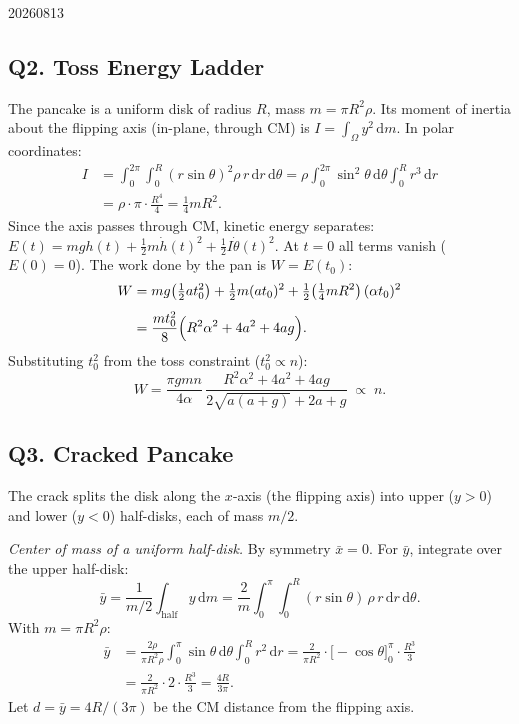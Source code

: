 \begin{solution}{20260813}
\subsection*{Q2. Toss Energy Ladder}

The pancake is a uniform disk of radius $R$, mass $m = \pi R^2\rho$.  Its moment of inertia about the flipping axis (in-plane, through CM) is $I = \int_\Omega y^2\,\mathrm{d}m$.  In polar coordinates:
\begin{align*}
I &= \int_0^{2\pi}\!\int_0^R (r\sin\theta)^2 \rho\,r\,\mathrm{d}r\,\mathrm{d}\theta
  = \rho \int_0^{2\pi}\!\sin^2\theta\,\mathrm{d}\theta \int_0^R r^3\,\mathrm{d}r \\[4pt]
  &= \rho \cdot \pi \cdot \frac{R^4}{4}
  = \frac{1}{4} m R^2.
\end{align*}
Since the axis passes through CM, kinetic energy separates: $E(t) = m g h(t) + \tfrac12 m \dot h(t)^2 + \tfrac12 I \dot\theta(t)^2$.  At $t = 0$ all terms vanish ($E(0) = 0$).  The work done by the pan is $W = E(t_0)$:
\begin{align*}
W &= m g\!\left(\tfrac12 a t_0^2\right)
    + \tfrac12 m (a t_0)^2
    + \tfrac12\!\left(\tfrac14 m R^2\right)(\alpha t_0)^2 \\[4pt]
  &= \frac{m t_0^2}{8}\Bigl(R^2\alpha^2 + 4a^2 + 4a g\Bigr).
\end{align*}
Substituting $t_0^2$ from the toss constraint ($t_0^2 \propto n$):
\[
\boxed{W = \frac{\pi g m n}{4\alpha}\,
    \frac{R^2\alpha^2 + 4a^2 + 4a g}{2\sqrt{a(a+g)} + 2a + g}
    \;\propto\; n}.
\]

\subsection*{Q3. Cracked Pancake}

The crack splits the disk along the $x$-axis (the flipping axis) into upper ($y>0$) and lower ($y<0$) half-disks, each of mass $m/2$.

\emph{Center of mass of a uniform half-disk.}  By symmetry $\bar x = 0$.  For $\bar y$, integrate over the upper half-disk:
\[
\bar y = \frac{1}{m/2}\int_{\text{half}} y\,\mathrm{d}m
       = \frac{2}{m}\int_0^\pi\!\!\int_0^R (r\sin\theta)\,\rho\,r\,\mathrm{d}r\,\mathrm{d}\theta.
\]
With $m = \pi R^2\rho$:
\begin{align*}
\bar y &= \frac{2\rho}{\pi R^2\rho}
         \int_0^\pi \sin\theta\,\mathrm{d}\theta \int_0^R r^2\,\mathrm{d}r
       = \frac{2}{\pi R^2}\cdot \bigl[-\cos\theta\bigr]_0^\pi \cdot \frac{R^3}{3} \\[4pt]
       &= \frac{2}{\pi R^2}\cdot 2 \cdot \frac{R^3}{3}
       = \frac{4R}{3\pi}.
\end{align*}
Let $d = \bar y = 4R/(3\pi)$ be the CM distance from the flipping axis.


\end{solution}
